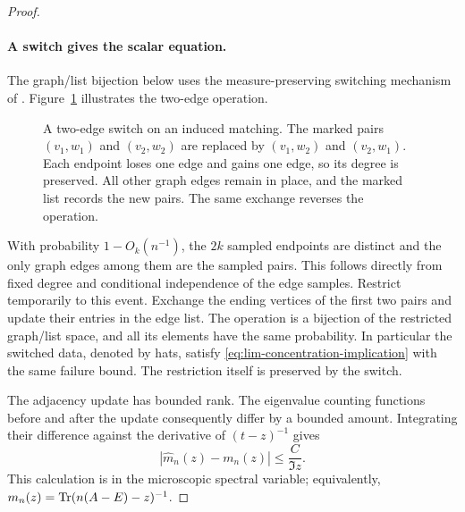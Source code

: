 \begin{proof}
\paragraph{A switch gives the scalar equation.}
The graph/list bijection below uses the measure-preserving switching
mechanism of \citet[Section~7.2, Propositions~7.3--7.4]{BauerschmidtHuangYauLocal}.
Figure~\ref{fig:two-edge-switch} illustrates the two-edge operation.
\begin{figure}[tbp]
 \centering
 
 \caption{A two-edge switch on an induced matching. The marked pairs
 \((v_1,w_1)\) and \((v_2,w_2)\) are replaced by
 \((v_1,w_2)\) and \((v_2,w_1)\). Each endpoint loses one edge and gains
 one edge, so its degree is preserved. All other graph edges remain in
 place, and the marked list records the new pairs. The same exchange
 reverses the operation.}
 \label{fig:two-edge-switch}
\end{figure}
With probability \(1-O_k(n^{-1})\), the \(2k\) sampled endpoints are
distinct and the only graph edges among them are the sampled pairs.
This follows directly from fixed degree and conditional independence
of the edge samples. Restrict temporarily to this event. Exchange the
ending vertices of the first two pairs and update their entries in the
edge list. The operation is a bijection of the restricted graph/list
space, and all its elements have the same probability. In particular
the switched data, denoted by hats, satisfy
\eqref{eq:lim-concentration-implication} with the same failure bound.
The restriction itself is preserved by the switch.

The adjacency update has bounded rank. The eigenvalue counting
functions before and after the update consequently differ by a bounded
amount. Integrating their difference against the derivative of
\((t-z)^{-1}\) gives
\begin{equation}\label{eq:lim-rank-trace}
 |\widehat m_n(z)-m_n(z)|\le \frac C{\Im z}.
\end{equation}
This calculation is in the microscopic spectral variable; equivalently,
\(m_n(z)=\operatorname{Tr}(n(A-E)-z)^{-1}\).


\end{proof}
